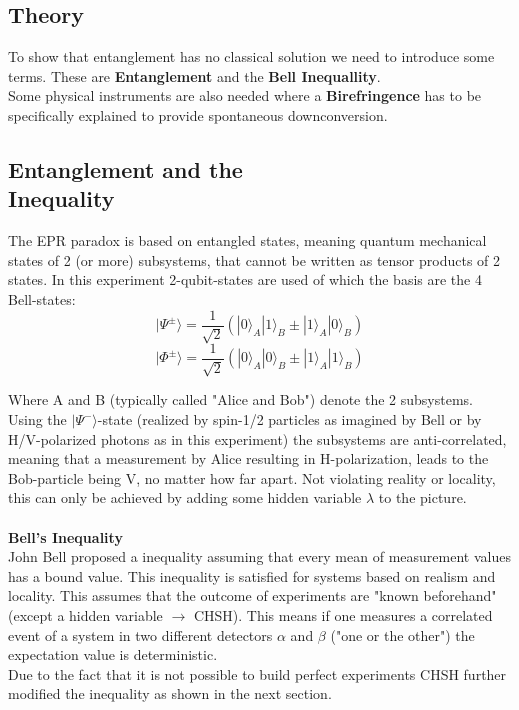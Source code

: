 \documentclass[12pt,a4paper]{article}
\begin{document}
\begin{multicols}{2}

\section{Theory}
\label{theory}
To show that entanglement has no classical solution we need to introduce some terms. These are \textbf{Entanglement} and the \textbf{Bell Inequallity}. \\
Some physical instruments are also needed where a \textbf{Birefringence} has to be specifically explained to provide spontaneous downconversion. \\

\subsection{Entanglement and the \\ Inequality}
The EPR paradox is based on entangled states, meaning quantum mechanical states of 2 (or more) subsystems, that cannot be written as tensor products of 2 states. In this experiment 2-qubit-states are used of which the basis are the 4 Bell-states:
$$|\Psi^{\pm}\rangle = \frac{1}{\sqrt{2}}(|0\rangle_A|1\rangle_B \pm |1\rangle_A|0\rangle_B)$$
$$|\Phi^{\pm}\rangle = \frac{1}{\sqrt{2}}(|0\rangle_A|0\rangle_B \pm |1\rangle_A|1\rangle_B)$$

\noindent Where A and B (typically called "Alice and Bob") denote the 2 subsystems.\\
Using the $|\Psi^{-}\rangle$-state (realized by spin-1/2 particles as imagined by Bell or by H/V-polarized photons as in this experiment) the subsystems are anti-correlated, meaning that a measurement by Alice resulting in H-polarization, leads to the Bob-particle being V, no matter how far apart. Not violating reality or locality, this can only be achieved by adding some hidden variable $\lambda$ to the picture.\\
\\
\textbf{Bell's Inequality}\\
John Bell proposed a inequality assuming that every mean of measurement values has a bound value. This inequality is satisfied for systems based on realism and locality. This assumes that the outcome of experiments are "known beforehand" (except a hidden variable $\rightarrow$ CHSH). This means if one measures a correlated event of a system in two different detectors $\alpha$ and $\beta$ ("one or the other") the expectation value is deterministic.\\
Due to the fact that it is not possible to build perfect experiments CHSH further modified the inequality as shown in the next section.


\end{multicols}
\end{document}
